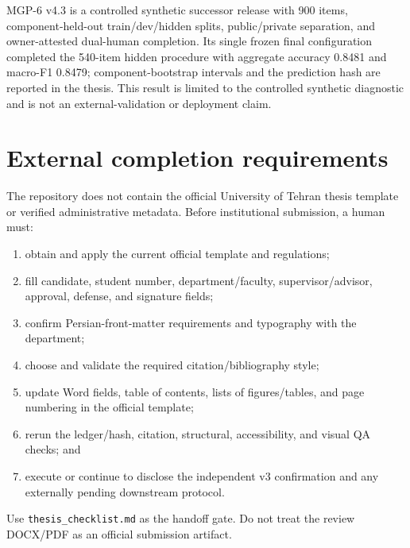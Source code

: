 MGP-6 v4.3 is a controlled synthetic successor release with 900 items,
component-held-out train/dev/hidden splits, public/private separation,
and owner-attested dual-human completion. Its single frozen final
configuration completed the 540-item hidden procedure with aggregate
accuracy 0.8481 and macro-F1 0.8479; component-bootstrap intervals and
the prediction hash are reported in the thesis. This result is limited
to the controlled synthetic diagnostic and is not an external-validation
or deployment claim.

\section{External completion
requirements}\label{external-completion-requirements}

The repository does not contain the official University of Tehran thesis
template or verified administrative metadata. Before institutional
submission, a human must:

\begin{enumerate}
\def\labelenumi{\arabic{enumi}.}
\tightlist
\item
  obtain and apply the current official template and regulations;
\item
  fill candidate, student number, department/faculty,
  supervisor/advisor, approval, defense, and signature fields;
\item
  confirm Persian-front-matter requirements and typography with the
  department;
\item
  choose and validate the required citation/bibliography style;
\item
  update Word fields, table of contents, lists of figures/tables, and
  page numbering in the official template;
\item
  rerun the ledger/hash, citation, structural, accessibility, and visual
  QA checks; and
\item
  execute or continue to disclose the independent v3 confirmation and
  any externally pending downstream protocol.
\end{enumerate}

Use \texttt{thesis\_checklist.md} as the handoff gate. Do not treat the
review DOCX/PDF as an official submission artifact.
